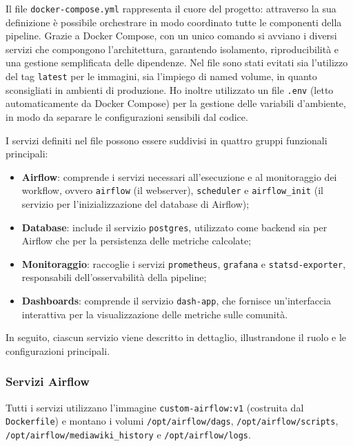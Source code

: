 Il file \texttt{docker-compose.yml} rappresenta il cuore del progetto: attraverso la sua definizione è possibile orchestrare in modo coordinato tutte le componenti della pipeline.  
Grazie a Docker Compose, con un unico comando si avviano i diversi servizi che compongono l’architettura, garantendo isolamento, riproducibilità e una gestione semplificata delle dipendenze.
Nel file sono stati evitati sia l’utilizzo del tag \texttt{latest} per le immagini, sia l’impiego di named volume, in quanto sconsigliati in ambienti di produzione.%
Ho inoltre utilizzato un file \texttt{.env} (letto automaticamente da Docker Compose) per la gestione delle variabili d’ambiente, in modo da separare le configurazioni sensibili dal codice.

I servizi definiti nel file possono essere suddivisi in quattro gruppi funzionali principali:  

\begin{itemize}
    \item \textbf{Airflow}: comprende i servizi necessari all’esecuzione e al monitoraggio dei workflow, ovvero \texttt{airflow} (il webserver), \texttt{scheduler} e \texttt{airflow\_init} (il servizio per l’inizializzazione del database di Airflow);
    \item \textbf{Database}: include il servizio \texttt{postgres}, utilizzato come backend sia per Airflow che per la persistenza delle metriche calcolate;
    \item \textbf{Monitoraggio}: raccoglie i servizi \texttt{prometheus}, \texttt{grafana} e \texttt{statsd-exporter}, responsabili dell’osservabilità della pipeline;
    \item \textbf{Dashboards}: comprende il servizio \texttt{dash-app}, che fornisce un’interfaccia interattiva per la visualizzazione delle metriche sulle comunità.
\end{itemize}


In seguito, ciascun servizio viene descritto in dettaglio, illustrandone il ruolo e le configurazioni principali.
\subsubsection{Servizi Airflow}

Tutti i servizi utilizzano l’immagine \texttt{custom-airflow:v1} (costruita dal \texttt{Dockerfile}) e montano i volumi \texttt{/opt/airflow/dags}, \texttt{/opt/airflow/scripts}, \texttt{/opt/airflow/mediawiki\_history} e \texttt{/opt/airflow/logs}.

